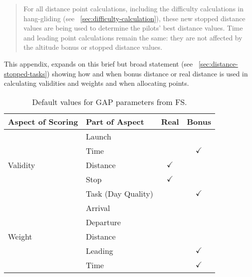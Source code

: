 \documentclass[gap.tex]{subfiles}
\begin{document}
\label{sec:bonus-distance-use}

\begin{quote}
    For all distance point calculations, including the difficulty calculations
    in hang-gliding (see ~\ref{sec:difficulty-calculation}), these new stopped
    distance values are being used to determine the pilots’ best distance
    values.  Time and leading point calculations remain the same: they are not
    affected by the altitude bonus or stopped distance values. 
\end{quote}

This appendix, expands on this brief but broad statement (see
~\ref{sec:distance-stopped-tasks}) showing how and when bonus distance or real
distance is used in calculating validities and weights and when allocating
points.

\begin{table}[!ht]
    \begin{tabularx}{\textwidth}{|l|X|c|c|}
    \hline
        \textbf{Aspect of Scoring}
        & \textbf{Part of Aspect}
        & \textbf{Real}
        & \textbf{Bonus}
        \\
    \hline
        \multirow{5}{*}{Validity}
        & Launch
        &
        &
        \\
    \cline{2-4}
        & Time
        &
        & $\checkmark$
        \\
    \cline{2-4}
        & Distance
        & $\checkmark$
        &
        \\
    \cline{2-4}
        & Stop
        & $\checkmark$
        &
        \\
    \cline{2-4}
        & Task (Day Quality)
        &
        & $\checkmark$
        \\
    \hline
        \multirow{5}{*}{Weight}
        & Arrival
        &
        &
        \\
    \cline{2-4}
        & Departure
        &
        &
        \\
    \cline{2-4}
        & Distance
        &
        &
        \\
    \cline{2-4}
        & Leading
        &
        & $\checkmark$
        \\
    \cline{2-4}
        & Time
        &
        & $\checkmark$
        \\
    \hline
    \end{tabularx}
    \caption{Default values for GAP parameters from FS.}
    \label{tab:gap-defaults}
\end{table}
\end{document}
